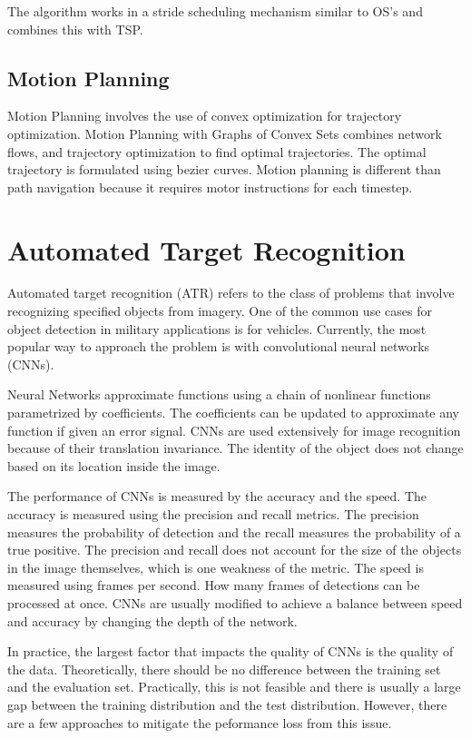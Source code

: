 \documentclass[12pt]{article}
\begin{document}
The algorithm works in a stride scheduling mechanism similar to OS's and combines this with TSP.
\cite{alamdariPersistentMonitoringDiscrete2012}

\subsection{Motion Planning}
Motion Planning involves the use of convex optimization for trajectory optimization. Motion Planning with Graphs of Convex Sets combines network flows, and trajectory optimization to find optimal trajectories. The optimal trajectory is formulated using bezier curves. Motion planning is different than path navigation because it requires motor instructions for each timestep.

\section{Automated Target Recognition}
Automated target recognition (ATR) refers to the class of problems that involve recognizing specified objects from imagery. One of the common use cases for object detection in military applications is for vehicles. Currently, the most popular way to approach the problem is with convolutional neural networks (CNNs).

Neural Networks approximate functions using a chain of nonlinear functions parametrized by coefficients. The coefficients can be updated to approximate any function if given an error signal. CNNs are used extensively for image recognition because of their translation invariance. The identity of the object does not change based on its location inside the image. 

The performance of CNNs is measured by the accuracy and the speed. The accuracy is measured using the precision and recall metrics. The precision measures the probability of detection and the recall measures the probability of a true positive. The precision and recall does not account for the size of the objects in the image themselves, which is one weakness of the metric. The speed is measured using frames per second. How many frames of detections can be processed at once. CNNs are usually modified to achieve a balance between speed and accuracy by changing the depth of the network.

In practice, the largest factor that impacts the quality of CNNs is the quality of the data. Theoretically, there should be no difference between the training set and the evaluation set. Practically, this is not feasible and there is usually a large gap between the training distribution and the test distribution. However, there are a few approaches to mitigate the peformance loss from this issue.
\end{document}
